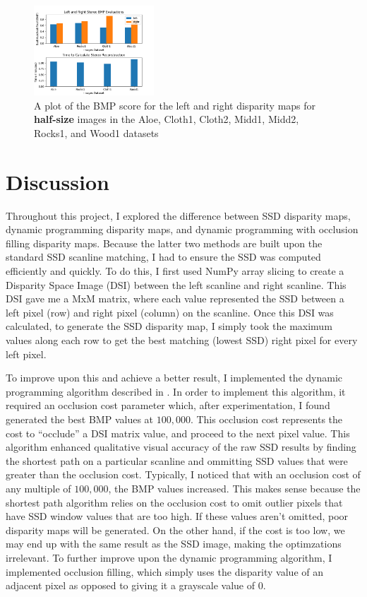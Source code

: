 \documentclass[11pt,a4paper]{article}
\begin{document}
\begin{figure}
  \centering
  \includegraphics[width=0.40\textwidth]{figures/half_plots.png}
  \caption{A plot of the BMP score for the left and right disparity maps for \textbf{half-size} images in the Aloe, Cloth1, Cloth2, Midd1, Midd2, Rocks1, and Wood1 datasets}
  \label{fig:half_plots}
\end{figure}


\section{Discussion}

Throughout this project, I explored the difference between SSD disparity maps, dynamic programming disparity maps, 
 and dynamic programming with occlusion filling disparity maps. Because the latter two methods are built upon the standard SSD 
 scanline matching, I had to ensure the SSD was computed efficiently and quickly. To do this, I first used NumPy array 
 slicing to create a Disparity Space Image (DSI) between the left scanline and right scanline. This DSI gave me a MxM matrix, 
 where each value represented the SSD between a left pixel (row) and right pixel (column) on the scanline. Once this DSI was calculated, 
 to generate the SSD disparity map, I simply took the maximum values along each row to get the best matching (lowest SSD) 
 right pixel for every left pixel. 

To improve upon this and achieve a better result, I implemented the dynamic programming algorithm described in \cite{COX1996542}. 
 In order to implement this algorithm, it required an occlusion cost parameter which, after experimentation, I found generated the best BMP values at $100,000$. This occlusion 
 cost represents the cost to “occlude” a DSI matrix value, and proceed to the next pixel value. This algorithm enhanced qualitative visual 
 accuracy of the raw SSD results by finding the shortest path on a particular scanline and ommitting SSD values that were greater than the occlusion cost. Typically, I noticed that with an occlusion cost of any multiple of $100,000$, 
 the BMP values increased. This makes sense because the shortest path algorithm relies on the occlusion cost to omit outlier pixels that have SSD window values that 
 are too high. If these values aren't omitted, poor disparity maps will be generated. On the other hand, if the cost is too low, we may end up with the same result as the SSD image, making the optimzations irrelevant. To further improve upon the dynamic programming algorithm, I implemented occlusion filling, which simply uses the disparity
 value of an adjacent pixel as opposed to giving it a grayscale value of $0$. 
 
\end{document}
